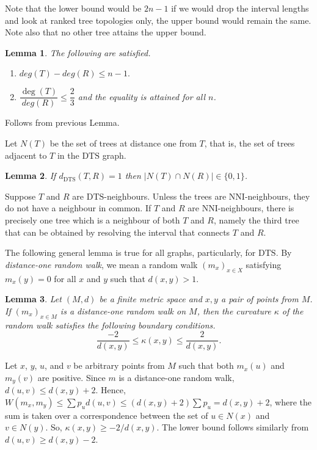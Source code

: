 \documentclass{amsart}
\newtheorem{lemma}{Lemma}
\newcommand{\dts}{\mathrm{DTS}}
\begin{document}
Note that the lower bound would be $2n-1$ if we would drop the interval lengths
and look at ranked tree topologies only, the upper bound would remain the same.
Note also that no other tree attains the upper bound. 

\begin{lemma} The following are satisfied. 
\begin{enumerate}[(1)]
\item $deg(T)-deg(R) \leq n-1.$
\item $\dfrac{\deg(T)}{deg(R)} \leq \dfrac23$ and the equality is attained for
all $n$. 
\end{enumerate}
\end{lemma}

\proof
Follows from previous Lemma. 
\endproof

Let $N(T)$ be the set of trees at distance one from $T$, that is, the set of
trees adjacent to $T$ in the $\dts$ graph. 

\begin{lemma}\label{intersecNeighb}
If $d_{\dts}(T,R) = 1$ then $|N(T)\cap N(R)|\in\{0,1\}$.
\end{lemma}

\proof
Suppose $T$ and $R$ are $\dts$-neighbours. Unless the trees are NNI-neighbours,
they do not have a neighbour in
common. If $T$ and $R$ are NNI-neighbours, there is precisely one tree which is
a neighbour of both $T$ and $R$, namely the third tree that can be obtained by
resolving the interval that connects $T$ and $R$. 
\endproof

The following general lemma is true for all graphs, particularly, for $\dts$. 
By {\em distance-one random walk}, we mean a random walk $(m_x)_{x \in X}$ 
satisfying $m_x(y) = 0$ for all $x$ and $y$ such that $d(x,y) > 1$. 

\begin{lemma}\label{curvBoundGeneral}
Let $(M,d)$ be a finite metric space and $x,y$ a pair of points from $M$. If
$(m_x)_{x \in M}$ is a distance-one random walk on $M$, then the curvature 
$\kappa$ of the random walk satisfies the following boundary conditions. 
\[
\dfrac{-2}{d(x,y)} \leq \kappa(x,y) \leq \dfrac{2}{d(x,y)}.
\]
\end{lemma}

\proof
Let $x$, $y$, $u$, and $v$ be arbitrary points from $M$ such that both $m_x(u)$
and $m_y(v)$ are positive. Since $m$ is a distance-one random walk, 
$d(u,v) \leq d(x,y) + 2$. Hence, 
$W(m_x,m_y) \leq \sum p_u d(u,v) \leq (d(x,y)+2)\sum p_u = d(x,y) + 2$, 
where the sum is taken over a correspondence between the set of $u \in N(x)$ and 
$v \in N(y)$. So, $\kappa(x,y) \geq - 2/d(x,y)$. The lower bound follows 
similarly from $d(u,v) \geq d(x,y) - 2$.
\endproof
\end{document}
